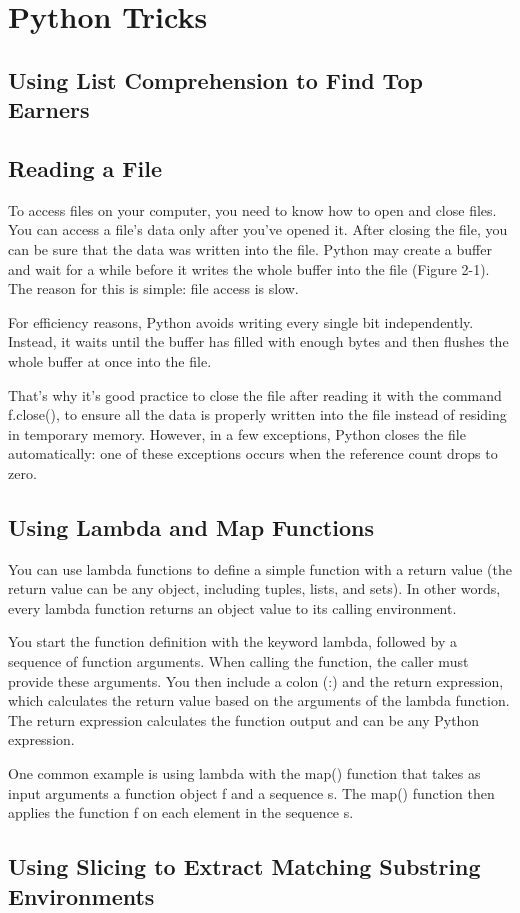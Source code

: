 \chapter{Python Tricks\label{Ch02}}
\section{Using List Comprehension to Find Top Earners}

\section{Reading a File}
To access files on your computer, you need to know how to open and close files. You can access a file's data only after you've opened it. After closing the file, you can be sure that the data was written into the file. Python may create a buffer and wait for a while before it writes the whole buffer into the file (Figure 2-1). The reason for this is simple: file access is slow.

For efficiency reasons, Python avoids writing every single bit independently. Instead, it waits until the buffer has filled with enough bytes and then flushes the whole buffer at once into the file.

That's why it's good practice to close the file after reading it with the
command f.close(), to ensure all the data is properly written into the file
instead of residing in temporary memory. However, in a few exceptions,
Python closes the file automatically: one of these exceptions occurs when
the reference count drops to zero.

\section{Using Lambda and Map Functions}
You can use lambda functions to define a simple function with a return value (the return value can be any object, including tuples, lists, and sets). In other words, every lambda function returns an object value to its calling environment. 


You start the function definition with the keyword lambda, followed by a sequence of function arguments. When calling the function, the caller must provide these arguments. You then include a colon (:) and the return expression, which calculates the return value based on the arguments of the lambda function. The return expression calculates the function output and can be any Python expression.

One common example is using lambda with the map() function that takes as input arguments a function object f and a sequence s. The map() function then applies the function f on each element in the sequence s.
\section{Using Slicing to Extract Matching Substring Environments}

